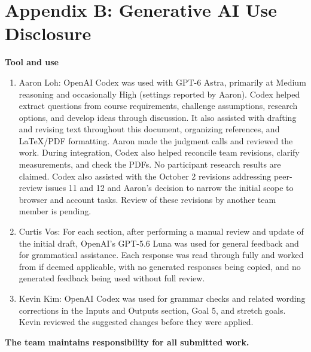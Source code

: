 \documentclass[11pt]{article}
\begin{document}
\section*{Appendix B: Generative AI Use Disclosure}
\textbf{Tool and use}
\begin{enumerate}
\item Aaron Loh: OpenAI Codex was used with GPT-6 Astra,
primarily at Medium reasoning and occasionally High (settings reported by
Aaron). Codex helped extract questions from course requirements, challenge
assumptions, research options, and develop ideas through discussion. It also
assisted with drafting and revising text throughout this document, organizing
references, and LaTeX/PDF formatting. Aaron made the judgment calls and reviewed
the work. During integration, Codex also helped reconcile team revisions,
clarify measurements, and check the PDFs. No participant research results are
claimed. Codex also assisted with the October 2 revisions addressing peer-review
issues 11 and 12 and Aaron's decision to narrow the initial scope to browser and
account tasks. Review of these revisions by another team member is pending.
\item Curtis Vos: For each section, after performing a manual review and update
of the initial draft, OpenAI's GPT-5.6 Luna was used for general feedback and for grammatical
assistance. Each response was read through fully and worked from if deemed applicable, with no
generated responses being copied, and no generated feedback being used without full review.
\item Kevin Kim: OpenAI Codex was used for grammar checks and related wording
corrections in the Inputs and Outputs section, Goal 5, and stretch goals.
Kevin reviewed the suggested changes before they were applied.

\end{enumerate}

\textbf{The team maintains responsibility for all submitted work.}

\clearpage
\end{document}
